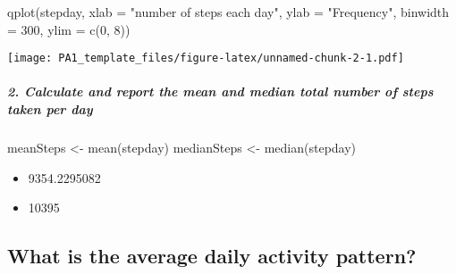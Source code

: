 \documentclass[
]{article}
\newenvironment{Shaded}{\begin{snugshade}}{\end{snugshade}}
\newcommand{\AttributeTok}[1]{\textcolor[rgb]{0.77,0.63,0.00}{#1}}
\newcommand{\DecValTok}[1]{\textcolor[rgb]{0.00,0.00,0.81}{#1}}
\newcommand{\FunctionTok}[1]{\textcolor[rgb]{0.00,0.00,0.00}{#1}}
\newcommand{\NormalTok}[1]{#1}
\newcommand{\OtherTok}[1]{\textcolor[rgb]{0.56,0.35,0.01}{#1}}
\newcommand{\SpecialCharTok}[1]{\textcolor[rgb]{0.00,0.00,0.00}{#1}}
\newcommand{\StringTok}[1]{\textcolor[rgb]{0.31,0.60,0.02}{#1}}
\providecommand{\tightlist}{%
  \setlength{\itemsep}{0pt}\setlength{\parskip}{0pt}}
\begin{document}
\begin{Shaded}
\begin{Highlighting}[]
\FunctionTok{qplot}\NormalTok{(stepday, }\AttributeTok{xlab =} \StringTok{"number of steps each day"}\NormalTok{, }\AttributeTok{ylab =} \StringTok{"Frequency"}\NormalTok{,}
      \AttributeTok{binwidth =} \DecValTok{300}\NormalTok{, }\AttributeTok{ylim =} \FunctionTok{c}\NormalTok{(}\DecValTok{0}\NormalTok{, }\DecValTok{8}\NormalTok{))}
\end{Highlighting}
\end{Shaded}

\texttt{[image: PA1\_template\_files/figure-latex/unnamed-chunk-2-1.pdf]}

\hypertarget{calculate-and-report-the-mean-and-median-total-number-of-steps-taken-per-day}{%
\subparagraph{2. Calculate and report the mean and median total number
of steps taken per
day}\label{calculate-and-report-the-mean-and-median-total-number-of-steps-taken-per-day}}

\begin{Shaded}
\begin{Highlighting}[]
\NormalTok{meanSteps }\OtherTok{\textless{}{-}} \FunctionTok{mean}\NormalTok{(stepday)}
\NormalTok{medianSteps }\OtherTok{\textless{}{-}} \FunctionTok{median}\NormalTok{(stepday)}
\end{Highlighting}
\end{Shaded}

\begin{itemize}
\tightlist
\item
  9354.2295082
\item
  10395
\end{itemize}

\hypertarget{what-is-the-average-daily-activity-pattern}{%
\subsection{What is the average daily activity
pattern?}\label{what-is-the-average-daily-activity-pattern}}

\begin{Shaded}
\end{Shaded}
\end{document}
